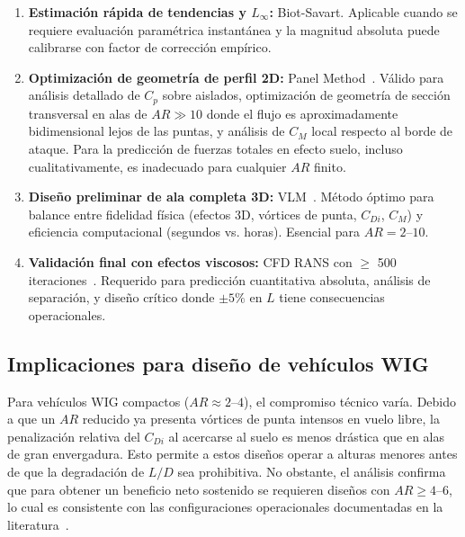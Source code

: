 \documentclass[twocolumn]{article}
\begin{document}
\begin{enumerate}
    \item \textbf{Estimación rápida de tendencias y $L_\infty$:} Biot-Savart. Aplicable cuando se requiere evaluación paramétrica instantánea y la magnitud absoluta puede calibrarse con factor de corrección empírico.
    
    \item \textbf{Optimización de geometría de perfil 2D:} Panel Method~\cite{hess1967}. Válido para análisis detallado de $C_p$ sobre aislados, optimización de geometría de sección transversal en alas de $\mathit{AR} \gg 10$ donde el flujo es aproximadamente bidimensional lejos de las puntas, y análisis de $C_M$ local respecto al borde de ataque. Para la predicción de fuerzas totales en efecto suelo, incluso cualitativamente, es inadecuado para cualquier $\mathit{AR}$ finito.
    
    \item \textbf{Diseño preliminar de ala completa 3D:} VLM~\cite{katz2001}. Método óptimo para balance entre fidelidad física (efectos 3D, vórtices de punta, $C_{Di}$, $C_M$) y eficiencia computacional (segundos vs. horas). Esencial para $AR = 2$--$10$.
    
    \item \textbf{Validación final con efectos viscosos:} CFD RANS con $\geq$ 500 iteraciones~\cite{versteeg2007}. Requerido para predicción cuantitativa absoluta, análisis de separación, y diseño crítico donde $\pm 5\%$ en $L$ tiene consecuencias operacionales.
\end{enumerate}

\subsection{Implicaciones para diseño de vehículos WIG}

Para vehículos WIG compactos ($\mathit{AR} \approx 2$--$4$), el compromiso técnico varía. Debido a que un $\mathit{AR}$ reducido ya presenta vórtices de punta intensos en vuelo libre, la penalización relativa del $C_{Di}$ al acercarse al suelo es menos drástica que en alas de gran envergadura. Esto permite a estos diseños operar a alturas menores antes de que la degradación de $L/D$ sea prohibitiva. No obstante, el análisis confirma que para obtener un beneficio neto sostenido se requieren diseños con $\mathit{AR} \geq 4$--$6$, lo cual es consistente con las configuraciones operacionales documentadas en la literatura~\cite{rozhdestvensky2006}.
\end{document}
